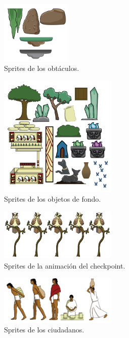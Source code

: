 \begin{figure}[H]
    \centering
    \includegraphics[width=0.3\textwidth]{Anexos/disenios/Obstaculos.png}
    \caption{Sprites de los obtáculos.}
    \label{fig:Obstacle}
\end{figure}

\begin{figure}[H]
    \centering
    \includegraphics[width=0.50\textwidth]{Anexos/disenios/ObjetosFondo.png}
    \caption{Sprites de los objetos de fondo.}
    \label{fig:backObjects}
\end{figure}

\begin{figure}[H]
    \centering
    \includegraphics[width=0.50\textwidth]{Anexos/disenios/CheckPoint.png}
    \caption{Sprites de la animación del checkpoint.}
    \label{fig:backObjects}
\end{figure}

\begin{figure}[H]
    \centering
    \includegraphics[width=0.50\textwidth]{Anexos/disenios/Ciudadanos.png}
    \caption{Sprites de los ciudadanos.}
    \label{fig:backObjects}
\end{figure}

